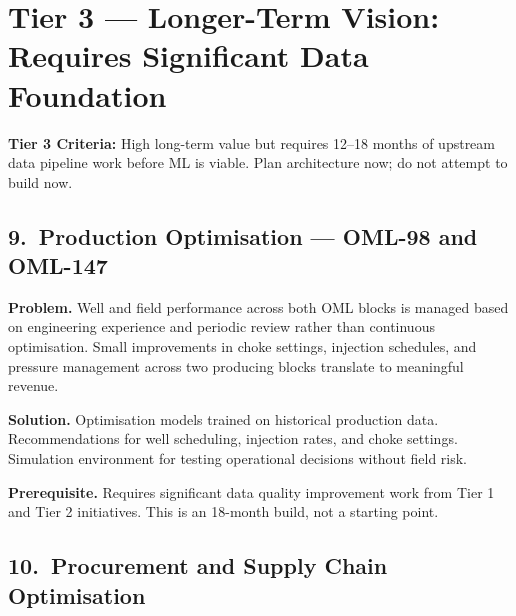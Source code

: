 \documentclass[10pt]{article}
\begin{document}
\vspace{10pt}

\section{Tier 3 --- Longer-Term Vision: Requires Significant Data Foundation}

\noindent\colorbox{tier3!10}{%
\begin{minipage}{\dimexpr\textwidth-2\fboxsep}
  \vspace{3pt}
  {\small\color{tier3}\textbf{Tier 3 Criteria:}
  High long-term value but requires 12--18 months of upstream data pipeline work
  before ML is viable. Plan architecture now; do not attempt to build now.}
  \vspace{3pt}
\end{minipage}}

\vspace{6pt}

\subsection*{9.\ Production Optimisation --- OML-98 and OML-147}

{\small
\textbf{Problem.}
Well and field performance across both OML blocks is managed based on engineering
experience and periodic review rather than continuous optimisation. Small improvements
in choke settings, injection schedules, and pressure management across two producing
blocks translate to meaningful revenue.

\vspace{4pt}
\textbf{Solution.}
Optimisation models trained on historical production data. Recommendations for well
scheduling, injection rates, and choke settings. Simulation environment for testing
operational decisions without field risk.

\vspace{4pt}
\textbf{Prerequisite.}
Requires significant data quality improvement work from Tier 1 and Tier 2 initiatives.
This is an 18-month build, not a starting point.
}

\vspace{8pt}

\subsection*{10.\ Procurement and Supply Chain Optimisation}
\end{document}
